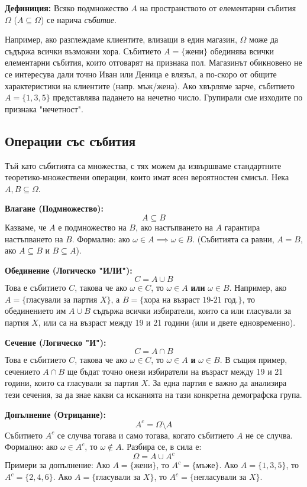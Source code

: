 \documentclass{article}
\begin{document}
\textbf{Дефиниция:} Всяко подмножество $A$ на пространството от елементарни събития $\Omega$ ($A \subseteq \Omega$) се нарича \emph{събитие}. 

Например, ако разглеждаме клиентите, влизащи в един магазин, $\Omega$ може да съдържа всички възможни хора. Събитието $A = \{\text{жени}\}$ обединява всички елементарни събития, които отговарят на признака пол. Магазинът обикновено не се интересува дали точно Иван или Деница е влязъл, а по-скоро от общите характеристики на клиентите (напр. мъж/жена).
Ако хвърляме зарче, събитието $A = \{ 1, 3, 5 \}$ представлява падането на нечетно число. Групирали сме изходите по признака "нечетност".

\subsection{Операции със събития}

Тъй като събитията са множества, с тях можем да извършваме стандартните теоретико-множествени операции, които имат ясен вероятностен смисъл. Нека $A, B \subseteq \Omega$.

\textbf{Влагане (Подмножество):}
\[
A \subseteq B
\]
Казваме, че $A$ е подмножество на $B$, ако настъпването на $A$ гарантира настъпването на $B$. Формално: ако $\omega \in A \implies \omega \in B$. (Събитията са равни, $A = B$, ако $A \subseteq B$ и $B \subseteq A$).

\textbf{Обединение (Логическо "ИЛИ"):}
\[
C = A \cup B
\]
Това е събитието $C$, такова че ако $\omega \in C$, то $\omega \in A$ \textbf{или} $\omega \in B$.
Например, ако $A = \{\text{гласували за партия } X\}$, а $B = \{\text{хора на възраст 19-21 год.}\}$, то обединението им $A \cup B$ съдържа всички избиратели, които са или гласували за партия $X$, или са на възраст между 19 и 21 години (или и двете едновременно).

\textbf{Сечение (Логическо "И"):}
\[
C = A \cap B
\]
Това е събитието $C$, такова че ако $\omega \in C$, то $\omega \in A$ \textbf{и} $\omega \in B$.
В същия пример, сечението $A \cap B$ ще бъдат точно онези избиратели на възраст между 19 и 21 години, които са гласували за партия $X$. За една партия е важно да анализира тези сечения, за да знае какви са исканията на тази конкретна демографска група.

\textbf{Допълнение (Отрицание):}
\[
A^c = \Omega \setminus A
\]
Събитието $A^c$ се случва тогава и само тогава, когато събитието $A$ не се случва. Формално: ако $\omega \in A^c$, то $\omega \notin A$.
Разбира се, в сила е:
\[
\Omega = A \cup A^c
\]
Примери за допълнение:
Ако $A = \{\text{жени}\}$, то $A^c = \{\text{мъже}\}$.
Ако $A = \{1, 3, 5\}$, то $A^c = \{2, 4, 6\}$.
Ако $A = \{\text{гласували за } X\}$, то $A^c = \{\text{негласували за } X\}$.
\end{document}

